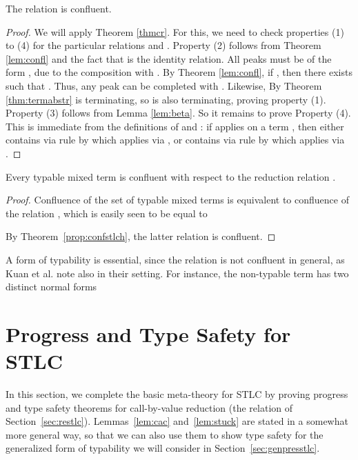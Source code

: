 \documentclass{LMCS}
\begin{document}
\begin{thm}
\label{prop:confstlch}
The relation  is confluent.
\end{thm}
\begin{proof}
We will apply Theorem \ref{thmcr}.  For this, we need to check
properties (1) to (4) for the particular relations
 and
. Property
(2) follows from Theorem \ref{lem:confl} and the fact that
 is the identity
relation. All peaks must be of the form , due to the composition with
. By Theorem
\ref{lem:confl}, if , then there exists
 such that . Thus, any
 peak  can be
completed with . Likewise, By Theorem \ref{thm:termabstr} 
is terminating, so  is also terminating, proving property (1). Property (3) follows from
Lemma \ref{lem:beta}. So it remains to prove Property (4). This is
immediate from the definitions of  and : if 
applies on a term , then  either contains  via rule
 by which  applies via , or
 contains  via rule  by which
 applies via . 
\end{proof}

\begin{cor}
\label{prop:confstlc}
Every typable mixed term is confluent with respect to the reduction
relation .
\end{cor}
\begin{proof} Confluence of the set of typable mixed terms is equivalent
to confluence of  the relation ,
which is easily seen to be equal to

\noindent By Theorem~\ref{prop:confstlch}, the latter relation is confluent.
\end{proof}

A form of typability is essential, since the relation  is not
confluent in general, as Kuan et al. note also in their setting.  For
instance, the non-typable term  has
two distinct normal forms


\section{Progress and Type Safety for STLC}
\label{sec:progtpsafe}

In this section, we complete the basic meta-theory for STLC by proving
progress and type safety theorems for call-by-value reduction (the
 relation of Section~\ref{sec:restlc}).  Lemmas~\ref{lem:cac}
and~\ref{lem:stuck} are stated in a somewhat more general way, so that
we can also use them to show type safety for the generalized form of
typability we will consider in Section~\ref{sec:genpresstlc}.
\end{document}
